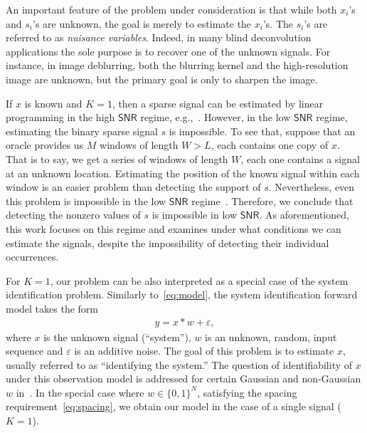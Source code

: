 \documentclass[english,11pt]{article}
\numberwithin{equation}{section}
\theoremstyle{plain}
\theoremstyle{definition}
\theoremstyle{remark}
\theoremstyle{plain}
\theoremstyle{remark}
\theoremstyle{plain}
\theoremstyle{plain}
\newcommand{\SNR}{{\textsf{SNR}}}
\begin{document}
An important feature of the problem under consideration is that while both $x_i$'s and $s_i$'s are unknown, the goal is merely to estimate the $x_i$'s. The  $s_i$'s  are referred to as \emph{nuisance  variables}. Indeed, in many blind deconvolution applications the sole purpose is to recover one of the unknown signals. For instance, in image deblurring, both the blurring
kernel and the high-resolution image are unknown, but the primary goal is only
to sharpen the image.

If $x$ is known and $K=1$, then a sparse signal can be estimated by linear programming  in the high $\SNR$ regime, e.g.,~\cite{azais2015spike,denoyelle2017support,bendory2016robust,bendory2017robust,bernstein2017deconvolution}. However, in the low $\SNR$ regime, estimating the binary sparse signal $s$ is impossible. To see that, suppose that an oracle provides us $M$ windows of length $W>L$, each contains one copy of $x$. That is to say, we get a series of windows of length $W$, each one contains a signal at an unknown location. 
Estimating the position of the known signal within each  window is an easier problem than detecting the support of $s$. 
Nevertheless, even this problem is impossible in the low $\SNR$ regime~\cite{aguerrebere2016fundamental}. Therefore, we conclude that detecting the nonzero values of $s$ is impossible in low $\SNR$. As aforementioned, this work focuses on this regime and examines under what conditions we can estimate the signals, despite the impossibility of detecting their individual occurrences.

For $K=1$, our problem can be also interpreted as a special case of the system identification problem. Similarly to~\eqref{eq:model}, the system identification forward model takes the form
\begin{eqnarray}
y = x\ast w + \varepsilon,  
\end{eqnarray} 
where $x$ is the unknown signal (``system''), $w$ is an unknown, random, input sequence and $\varepsilon$ is an additive noise.   
The goal of this problem is to estimate $x$, usually referred to as ``identifying the system.'' The question of identifiability of $x$ under
this observation model is addressed for certain Gaussian and non-Gaussian $w$ in~\cite{benveniste1980robust,kormylo1983identifiability}.
In the special case where $w\in\{0,1\}^N$, satisfying the spacing requirement~\eqref{eq:spacing}, we obtain our
model in the  case of a single signal ($K = 1$).
\end{document}
